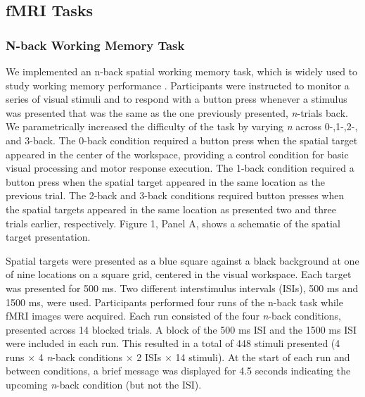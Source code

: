 \documentclass[a4paper,fleqn]{cas-sc}
\begin{document}
\subsection{fMRI Tasks}

\subsubsection{N-back Working Memory Task}
We implemented an n-back spatial working memory task, which is widely used to study working memory performance \citep{Owen2005}. Participants were instructed to monitor a series of visual stimuli and to respond with a button press whenever a stimulus was presented that was the same as the one previously presented, \textit{n}-trials back. We parametrically increased the difficulty of the task by varying \textit{n} across 0-,1-,2-, and 3-back. The 0-back condition required a button press when the spatial target appeared in the center of the workspace, providing a control condition for basic visual processing and motor response execution. The 1-back condition required a button press when the spatial target appeared in the same location as the previous trial. The 2-back and 3-back conditions required button presses when the spatial targets appeared in the same location as presented two and three trials earlier, respectively. Figure 1, Panel A, shows a schematic of the spatial target presentation.

Spatial targets were presented as a blue square against a black background at one of nine locations on a square grid, centered in the visual workspace. Each target was presented for 500 ms. Two different interstimulus intervals (ISIs), 500 ms and 1500 ms, were used. Participants performed four runs of the n-back task while fMRI images were acquired. Each run consisted of the four \textit{n}-back conditions, presented across 14 blocked trials. A block of the 500 ms ISI and the 1500 ms ISI were included in each run. This resulted in a total of 448 stimuli presented (4 runs $\times$ 4 \textit{n}-back conditions $\times$ 2 ISIs $\times$ 14 stimuli). At the start of each run and between conditions, a brief message was displayed for 4.5 seconds indicating the upcoming \textit{n}-back condition (but not the ISI).
\end{document}
